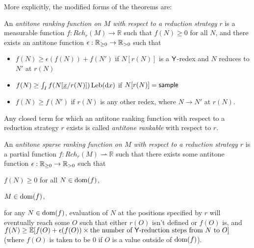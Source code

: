 More explicitly, the modified forms of the theorems are:
\begin{definition}
An \emph{antitone ranking function on $M$ with respect to a reduction strategy $r$} is a measurable function $f:\mathit{Rch}_r(M) \to \mathbb{R}$ such that $f(N) \geq 0$ for all $N$, and there exists an antitone function $\epsilon : \mathbb{R}_{{\geq}0} \to \mathbb{R}_{{>}0}$ such that
\begin{itemize}
    \item $f(N) \geq \epsilon(f(N)) + f(N')$ if $N[r(N)]$ is a $\mathsf{Y}$-redex and $N$ reduces to $N'$ at $r(N)$
    \item $f(N) \geq \int_I f(N[\underline{x}/r(N)]) \, \mathrm{Leb}(\mathrm{d}x)$ if $N[r(N)] = \mathsf{sample}$

    \item $f(N) \geq f(N')$ if $r(N)$ is any other redex, where $N \to N'$ at $r(N)$.
\end{itemize}
Any closed term for which an antitone ranking function with respect to a reduction strategy $r$ exists is called \emph{antitone rankable} with respect to $r$. 
\end{definition}

\begin{definition}
An \emph{antitone sparse ranking function on $M$ with respect to a reduction strategy $r$} is a partial function $f : \mathit{Rch}_r(M) \rightharpoonup \mathbb R$ such that there exists some antitone function $\epsilon : \mathbb{R}_{{\geq}0} \to \mathbb{R}_{{>}0}$ such that
\begin{inparaenum}[(i)]
    \item $f(N) \geq 0$ for all $N \in \operatorname{dom}(f)$,
    \item $M \in \operatorname{dom}(f)$,
    \item for any $N \in \operatorname{dom}(f)$, evaluation of $N$ at the positions specified by $r$ will eventually reach some $O$ such that either $r(O)$ isn't defined or $f(O)$ is, and $f(N) \geq \mathbb E[f(O) + \epsilon(f(O)) \times \text{the number of $\tY$-reduction steps from $N$ to $O$}]$ (where $f(O)$ is taken to be 0 if $O$ is a value outside of $\operatorname{dom}(f)$).
\end{inparaenum}
\iffalse
\begin{itemize}
    \item $f(N) \geq 0$ for all $N$ where $f$ is defined.
    \item $f$ is defined at $M$.
    \item For any $N$ in the domain of definition of $f$, evaluation of $N$ at the positions specified by $r$ will eventually reach some $O$ such that either $r(O)$ isn't defined or $f(O)$ is, and $f(N) \geq \mathbb E[f(O) + \epsilon(f(O)) \times \text{the number of $\tY$-reduction steps from $N$ to $O$}]$ (where $f(O)$ is taken to be 0 if $O$ is a value outside of the domain of $f$).
\end{itemize}
\fi
\end{definition}


